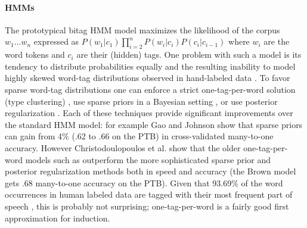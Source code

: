 \paragraph{HMMs}
The prototypical bitag HMM model maximizes the likelihood of the
corpus $w_1 \ldots w_n$ expressed as $P(w_1|c_1)\prod_{i=2}^n
P(w_i|c_i) P(c_i|c_{i-1})$ where $w_i$ are the word tokens and $c_i$
are their (hidden) tags.  One problem with such a model is its
tendency to distribute probabilities equally and the resulting
inability to model highly skewed word-tag distributions observed in
hand-labeled data \cite{johnson:2007:EMNLP-CoNLL2007}.  To favor
sparse word-tag distributions one can enforce a strict
one-tag-per-word solution (type clustering)
\cite{Brown:1992:CNG:176313.176316,Clark:2003:CDM:1067807.1067817},
use sparse priors in a Bayesian setting
\cite{goldwater-griffiths:2007:ACLMain,johnson:2007:EMNLP-CoNLL2007},
or use posterior regularization
\cite{Ganchev:2010:PRS:1859890.1859918}.  Each of these techniques
provide significant improvements over the standard HMM model: for
example Gao and Johnson  show
that sparse priors can gain from 4\% (.62 to .66 on the PTB) in
cross-validated many-to-one accuracy.  However Christodoulopoulos et
al.  show that
the older one-tag-per-word models such as
\cite{Brown:1992:CNG:176313.176316} outperform the more sophisticated
sparse prior and posterior regularization methods both in speed and
accuracy (the Brown model gets .68 many-to-one accuracy on the PTB).
Given that 93.69\% of the word occurrences in human labeled data are
tagged with their most frequent part of speech
\cite{Toutanova:2003:FPT:1073445.1073478}, this is probably not
surprising; one-tag-per-word is a fairly good first approximation for
induction.


